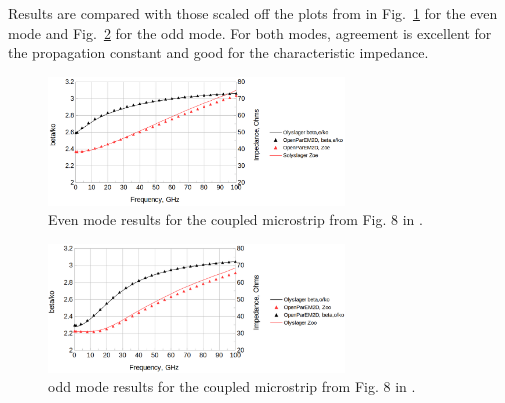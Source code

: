 \documentclass[titlepage]{article}
\renewcommand\_{\textunderscore\linebreak[1]}
\begin{document}
Results are compared with those scaled off the plots from \cite{Olyslager} in Fig.~\ref{fig:diffpair_even} for the even mode and Fig.~\ref{fig:diffpair_odd} for the odd mode.  For both modes, agreement is excellent for the propagation constant and good for the characteristic impedance.
\begin{figure}[H]
  \centering
  \includegraphics[width=0.7\textwidth]{../regression/OpenParEM2D/differential_pair/diff_pair_study/screenshots/diffpair_even}
  \caption{Even mode results for the coupled microstrip from Fig. 8 in \cite{Olyslager}.}
  \label{fig:diffpair_even}
\end{figure}
\begin{figure}[H]
  \centering
  \includegraphics[width=0.7\textwidth]{../regression/OpenParEM2D/differential_pair/diff_pair_study/screenshots/diffpair_odd}
  \caption{odd mode results for the coupled microstrip from Fig. 8 in \cite{Olyslager}.}
  \label{fig:diffpair_odd}
\end{figure}
\end{document}
